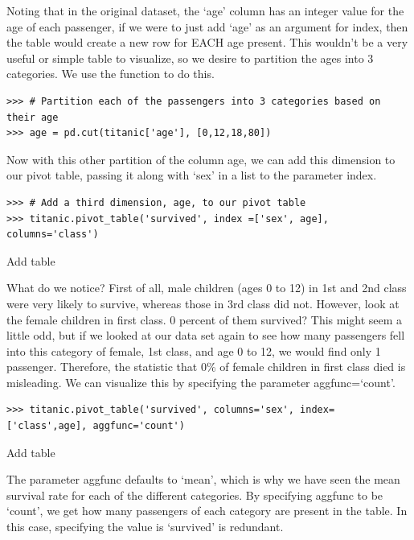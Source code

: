 Noting that in the original dataset, the `age' column has an integer value for the age of each passenger, if we were to just add `age' as an argument for index, then the table would create a new row for EACH age present. This wouldn't be a very useful or simple table to visualize, so we desire to partition the ages into 3 categories. We use the function  to do this.

\begin{lstlisting}
>>> # Partition each of the passengers into 3 categories based on their age
>>> age = pd.cut(titanic['age'], [0,12,18,80])
\end{lstlisting}

Now with this other partition of the column age, we can add this dimension to our pivot table, passing it along with `sex' in a list to the parameter index.

\begin{lstlisting}
>>> # Add a third dimension, age, to our pivot table
>>> titanic.pivot_table('survived', index =['sex', age], columns='class')
\end{lstlisting}

Add table

What do we notice? First of all, male children (ages 0 to 12) in 1st and 2nd class were very likely to survive, whereas those in 3rd class did not. However, look at the female children in first class. 0 percent of them survived? This might seem a little odd, but if we looked at our data set again to see how many passengers fell into this category of female, 1st class, and age 0 to 12, we would find only 1 passenger. Therefore, the statistic that 0\% of female children in first class died is misleading. We can visualize this by specifying the parameter aggfunc=`count'.

\begin{lstlisting}
>>> titanic.pivot_table('survived', columns='sex', index=['class',age], aggfunc='count')
\end{lstlisting}

Add table

The parameter aggfunc defaults to `mean', which is why we have seen the mean survival rate for each of the different categories. By specifying aggfunc to be `count', we get how many passengers of each category are present in the table. In this case, specifying the value is `survived' is redundant.

